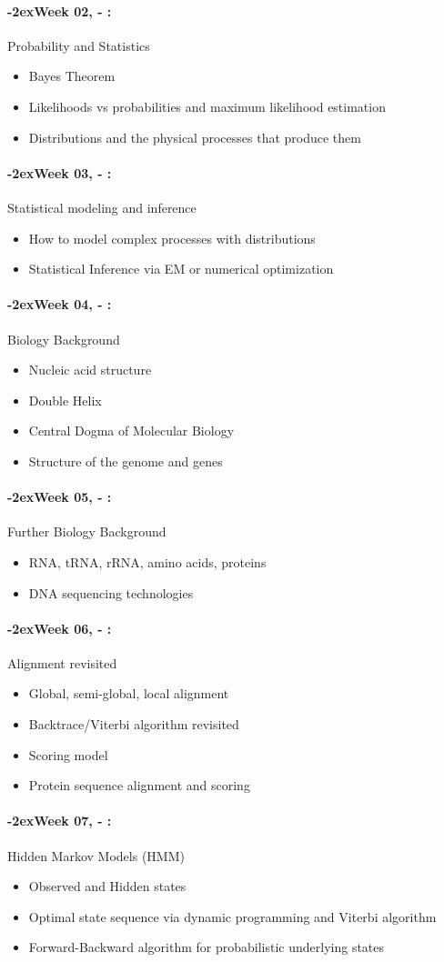 \documentclass[11pt]{article}
\newcommand{\week}[1]{%
  \paragraph*{\kern-2ex\quad #1, \syldate{\today} - \AdvanceDate[4]\syldate{\today}:}%
  \ifdim\wd1=\wd\MONDAY
    \AdvanceDate[7]
  \else
    \AdvanceDate[7]
  \fi%
}
\begin{document}
\week{Week 02} Probability and Statistics
\begin{itemize}
\item Bayes Theorem
\item Likelihoods vs probabilities and maximum likelihood estimation
\item Distributions and the physical processes that produce them
\end{itemize}

\week{Week 03} Statistical modeling and inference
\begin{itemize}
\item How to model complex processes with distributions
\item Statistical Inference via EM or numerical optimization
\end{itemize}

\week{Week 04} Biology Background
\begin{itemize}
\item Nucleic acid structure
\item Double Helix
\item Central Dogma of Molecular Biology
\item Structure of the genome and genes
\end{itemize}

\week{Week 05} Further Biology Background
\begin{itemize}
\item RNA, tRNA, rRNA, amino acids, proteins
\item DNA sequencing technologies
\end{itemize}

\week{Week 06} Alignment revisited
\begin{itemize}
\item Global, semi-global, local alignment
\item Backtrace/Viterbi algorithm revisited
\item Scoring model
\item Protein sequence alignment and scoring
\end{itemize}

\week{Week 07} Hidden Markov Models (HMM)
\begin{itemize}
\item Observed and Hidden states
\item Optimal state sequence via dynamic programming and Viterbi algorithm
\item Forward-Backward algorithm for probabilistic underlying states
\end{itemize}
\end{document}
